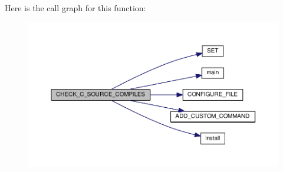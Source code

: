 Here is the call graph for this function\+:
\nopagebreak
\begin{figure}[H]
\begin{center}
\leavevmode
\includegraphics[width=350pt]{CMakeLists_8txt_aead81ed16e7122477a43c587db6eb5bc_cgraph}
\end{center}
\end{figure}


